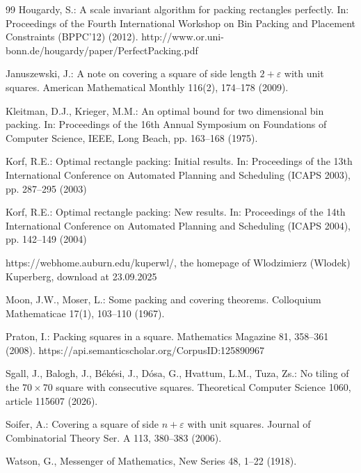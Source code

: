 \documentclass[twoside]{amsart}
\begin{document}
\begin{thebibliography}{99}
Hougardy, S.: A scale invariant algorithm for packing
rectangles perfectly. In: Proceedings of the Fourth International Workshop on
Bin Packing and Placement Constraints (BPPC'12) (2012). http://www.or.uni-bonn.de/hougardy/paper/PerfectPacking.pdf

Januszewski, J.: A note on covering a square of side
length $2+\varepsilon$ with unit squares. American Mathematical Monthly
116(2), 174--178 (2009).

Kleitman, D.J., Krieger, M.M.: An optimal bound for two
dimensional bin packing. In: Proceedings of the 16th Annual Symposium on
Foundations of Computer Science, IEEE, Long Beach, pp. 163--168 (1975).

Korf, R.E.: Optimal rectangle packing: Initial results. In:
Proceedings of the 13th International Conference on Automated Planning and
Scheduling (ICAPS 2003), pp. 287--295 (2003)

Korf, R.E.: Optimal rectangle packing: New results. In:
Proceedings of the 14th International Conference on Automated Planning and
Scheduling (ICAPS 2004), pp. 142--149 (2004)

https://webhome.auburn.edu/kuperwl/, the
homepage of Wlodzimierz (Wlodek) Kuperberg, download at 23.09.2025

Moon, J.W., Moser, L.: Some packing and covering theorems.
Colloquium Mathematicae 17(1), 103--110 (1967).

Praton, I.: Packing squares in a square. Mathematics
Magazine 81, 358--361 (2008).  https://api.semanticscholar.org/CorpusID:125890967

Sgall, J., Balogh, J.,
B\'{e}k\'{e}si, J., D\'{o}sa, G., Hvattum, L.M., Tuza, Zs.: No
tiling of the $70\times70$ square with consecutive squares. Theoretical Computer
Science 1060, article 115607 (2026).

%

Soifer, A.: Covering a square of side $n+\varepsilon$ with
unit squares. Journal of Combinatorial Theory Ser. A 113, 380--383 (2006).

Watson, G., Messenger of Mathematics, New Series 48,
1--22 (1918).

\end{thebibliography}
\end{document}
